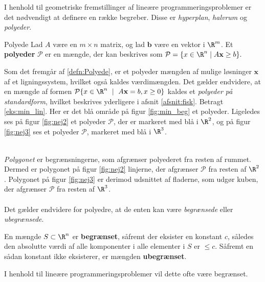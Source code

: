 I henhold til geometriske fremstillinger af lineære programmeringsproblemer er det nødvendigt at definere en række begreber.
Disse er \textit{hyperplan}, \textit{halvrum} og \textit{polyeder}.
%
\begin{defn}{}{Polyede}
Lad $A$ være en $m \times n$ matrix, og lad $\mathbf{b}$ være en vektor i  $\R^m$.
Et \textbf{polyeder} $\mathcal{P}$ er en mængde, der kan beskrives som 
$\mathcal{P} = \{x\in \R^n \mid A\mathbf{x}\geq b\}.$
%
\end{defn}
\noindent
%
Som det fremgår af \ref{defn:Polyede}, er et polyeder mængden af mulige løsninger $\mathbf{x}$ af et ligningssystem, hvilket også kaldes værdimængden.
Det gælder endvidere, at en mængde af formen $\mathcal{P} \{x \in \R^n \text{ } \mid \text{ } A\textbf{x} = b,x \geq 0 \}$ kaldes et \textit{polyeder på standardform}, hvilket beskrives yderligere i afsnit \ref{afsnit:fisk}.
%
%
Betragt \ref{eks:min_lin}.
Her er det blå område på figur \ref{fig:min_beg} et polyeder. 
Ligeledes ses på figur \ref{fig:nej2} et polyeder $\mathcal{P}$, der er markeret med blå i $\R^2$, og på figur \ref{fig:nej3} ses et polyeder $\mathcal{P}$, markeret med blå i $\R^3$. 
%
%
\begin{center}
$
\begin{array}{cc}
&

\end{array}
$
\end{center}
%
\textit{Polygonet} er begrænsningerne, som afgrænser polyederet fra resten af rummet. 
Dermed er polygonet på figur \ref{fig:nej2} linjerne, der afgrænser $\mathcal{P}$ fra resten af $\R^2$.
Polygonet på figur \ref{fig:nej3} er derimod udsnittet af fladerne, som udgør kuben, der afgrænser $\mathcal{P}$ fra resten af $\R^3$.
\\\\
%
Det gælder endvidere for polyedre, at de enten kan være \textit{begrænsede} eller \textit{ubegrænsede}.
%
\begin{defn}{}{}
En mængde $S \subset \R^n$ er \textbf{begrænset}, såfremt der eksister en konstant $c$, således den absolutte værdi af alle komponenter i alle elementer i $S$ er $\leq c$. 
Såfremt en sådan konstant ikke eksisterer, er mængden \textbf{ubegrænset}. 
\end{defn}
\noindent
% 
%
%
I henhold til lineære programmeringsproblemer vil dette ofte være begrænset.
